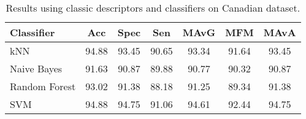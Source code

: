 \documentclass[12pt,italian]{article}
\begin{document}


\begin{table}
	\centering
	\caption{Results using classic descriptors and classifiers on Canadian dataset.}
	\label{tab:classicClassificationCanada}
	\begin{tabular}{lcccccc}
		\toprule
		Classifier    &  Acc  & Spec  &  Sen  & MAvG  &  MFM  & MAvA  \\ \midrule
		kNN           & 94.88 & 93.45 & 90.65 & 93.34 & 91.64 & 93.45 \\
		Naive Bayes   & 91.63 & 90.87 & 89.88 & 90.77 & 90.32 & 90.87 \\
		Random Forest & 93.02 & 91.38 & 88.18 & 91.25 & 89.34 & 91.38 \\
		SVM           & 94.88 & 94.75 & 91.06 & 94.61 & 92.44 & 94.75 \\ \bottomrule
	\end{tabular}
\end{table}
\end{document}
